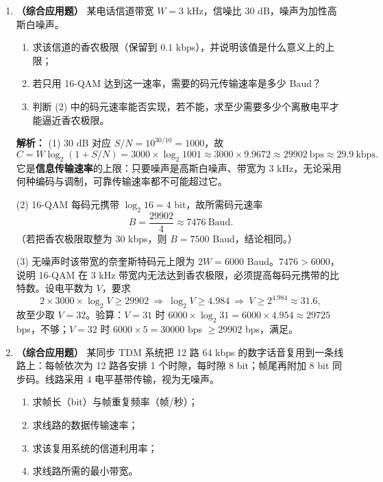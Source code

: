 \begin{enumerate}
\vspace{8pt}

\item \textbf{（综合应用题）} 某电话信道带宽 $W=3$ kHz，信噪比 $30$ dB，噪声为加性高斯白噪声。
\begin{enumerate}
    \item[(1)] 求该信道的香农极限（保留到 $0.1$ kbps），并说明该值是什么意义上的上限；
    \item[(2)] 若只用 16-QAM 达到这一速率，需要的码元传输速率是多少 Baud？
    \item[(3)] 判断 (2) 中的码元速率能否实现，若不能，求至少需要多少个离散电平才能逼近香农极限。
\end{enumerate}

\ifshowsolutions\par\noindent\textbf{解析：}
(1) $30$ dB 对应 $S/N=10^{30/10}=1000$，故
\[
C=W\log_2(1+S/N)=3000\times\log_2 1001\approx3000\times9.9672\approx29902\ \text{bps}\approx29.9\ \text{kbps}.
\]
它是\textbf{信息传输速率}的上限：只要噪声是高斯白噪声、带宽为 3 kHz，无论采用何种编码与调制，可靠传输速率都不可能超过它。

(2) 16-QAM 每码元携带 $\log_2 16=4$ bit，故所需码元速率
\[
B=\frac{29902}{4}\approx7476\ \text{Baud}.
\]
（若把香农极限取整为 30 kbps，则 $B=7500$ Baud，结论相同。）

(3) 无噪声时该带宽的奈奎斯特码元上限为 $2W=6000$ Baud。$7476>6000$，说明 16-QAM 在 3 kHz 带宽内无法达到香农极限，必须提高每码元携带的比特数。设电平数为 $V$，要求
\[
2\times3000\times\log_2 V\ge 29902\ \Rightarrow\ \log_2 V\ge4.984\ \Rightarrow\ V\ge2^{4.984}\approx31.6,
\]
故至少取 $V=32$。验算：$V=31$ 时 $6000\times\log_2 31=6000\times4.954\approx29725$ bps，不够；$V=32$ 时 $6000\times5=30000$ bps $\ge29902$ bps，满足。

\else \answerarea[10] \fi

\vspace{8pt}

\item \textbf{（综合应用题）} 某同步 TDM 系统把 12 路 $64$ kbps 的数字话音复用到一条线路上：每帧依次为 12 路各安排 1 个时隙，每时隙 8 bit；帧尾再附加 8 bit 同步码。线路采用 4 电平基带传输，视为无噪声。
\begin{enumerate}
    \item[(1)] 求帧长（bit）与帧重复频率（帧/秒）；
    \item[(2)] 求线路的数据传输速率；
    \item[(3)] 求该复用系统的信道利用率；
    \item[(4)] 求线路所需的最小带宽。
\end{enumerate}


\end{enumerate}
